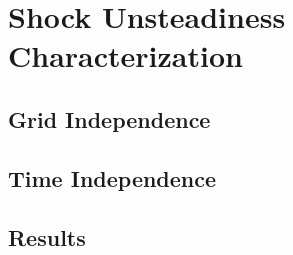 \section{Shock Unsteadiness Characterization}

\subsection{Grid Independence}

\subsection{Time Independence}

\subsection{Results}